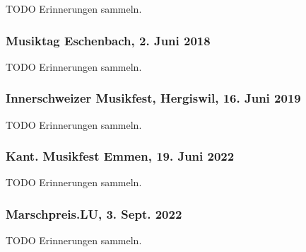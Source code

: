 \begin{history}
    TODO Erinnerungen sammeln.


    \subsubsection*{Musiktag Eschenbach, 2. Juni 2018}

    TODO Erinnerungen sammeln.



    \subsubsection*{Innerschweizer Musikfest, Hergiswil, 16. Juni 2019}

    TODO Erinnerungen sammeln.


    \subsubsection*{Kant. Musikfest Emmen, 19. Juni 2022}

    TODO Erinnerungen sammeln.


    \subsubsection*{Marschpreis.LU, 3. Sept. 2022}

    TODO Erinnerungen sammeln.


\end{history}